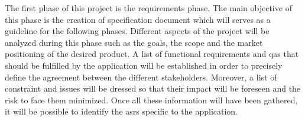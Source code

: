 The first phase of this project is the requirements phase. The main objective of this phase is the creation of specification document which will serves as a guideline for the following phases. Different aspects of the project will be analyzed during this phase such as the goals, the scope and the market positioning of the desired product. A list of functional requirements and \glspl{qa} that should be fulfilled by the application will be established in order to precisely define the agreement between the different stakeholders. Moreover, a list of constraint and issues will be dressed so that their impact will be foreseen and the risk to face them minimized. Once all these information will have been gathered, it will be possible to identify the \glspl{asr} specific to the application. \cite[Chapter 16]{bass2013}
